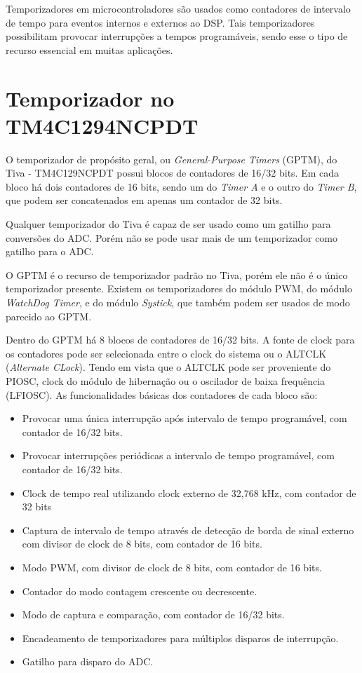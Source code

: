 
Temporizadores em microcontroladores são usados como contadores de intervalo de tempo para eventos internos e externos ao DSP. Tais temporizadores possibilitam provocar interrupções a tempos programáveis, sendo esse o tipo de recurso essencial em muitas aplicações.  

\section{Temporizador no TM4C1294NCPDT}

O temporizador de propósito geral, ou \emph{General-Purpose Timers} (GPTM),  do Tiva - TM4C129NCPDT possui blocos de contadores de 16/32 bits. Em cada bloco há dois contadores de 16 bits, sendo um do \emph{Timer A} e o outro do \emph{Timer B}, que podem ser concatenados em apenas um contador de 32 bits.

Qualquer temporizador do Tiva é capaz de ser usado como um gatilho para conversões do ADC. Porém não se pode usar mais de um temporizador como gatilho para o ADC.

O GPTM é o recurso de temporizador padrão no Tiva, porém ele não é o único temporizador presente. Existem os temporizadores do módulo PWM, do módulo \emph{WatchDog Timer}, e do módulo \emph{Systick}, que também podem ser usados de modo parecido ao GPTM. 

Dentro do GPTM há 8 blocos de contadores de 16/32 bits. A fonte de clock para os contadores pode ser selecionada entre o clock do sistema ou o ALTCLK (\emph{Alternate CLock}). Tendo em vista que o ALTCLK pode ser proveniente do PIOSC, clock do módulo de hibernação ou o oscilador de baixa frequência (LFIOSC).  As funcionalidades básicas dos contadores de cada bloco são: 

\begin{itemize}
	\item Provocar uma única interrupção após intervalo de tempo programável, com contador de 16/32 bits.
	\item Provocar interrupções periódicas a intervalo de tempo programável, com contador de 16/32 bits.
	\item Clock de tempo real utilizando clock externo de 32,768 kHz, com contador de 32 bits
	\item Captura de intervalo de tempo através de detecção de borda de sinal externo com divisor de clock de 8 bits, com contador de 16 bits. 
	\item Modo PWM, com divisor de clock de 8 bits, com contador de 16 bits.
	\item Contador do modo contagem crescente ou decrescente.
	\item Modo de captura e comparação, com contador de 16/32 bits.
	\item Encadeamento de temporizadores para múltiplos disparos de interrupção.
	\item Gatilho para disparo do ADC.
\end{itemize}

